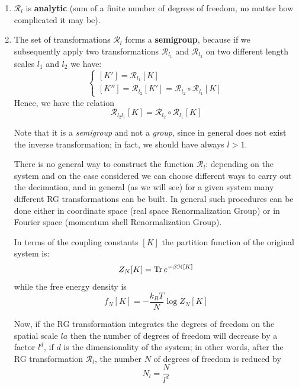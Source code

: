 \documentclass[../main/main.tex]{subfiles}
\begin{document}
\begin{enumerate}
\item \( \mathcal{R}_l \) is \textbf{analytic} (sum of a finite number of degrees of freedom, no matter how complicated it may be).


\item The set of  transformations \( \mathcal{R}_l \) forms a \textbf{semigroup}, because if we subsequently apply two transformations \(\mathcal{R}_{l_1}  \) and \(\mathcal{R}_{l_2}  \) on two different length scales \( l_1 \)  and \( l_2 \) we have:
\begin{equation*}
  \begin{cases}
   [K'] = \mathcal{R}_{l_1} [K] \\
  [K''] = \mathcal{R}_{l_2} [K'] = \mathcal{R}_{l_2} \circ \mathcal{R}_{l_1} [K]
  \end{cases}
\end{equation*}
Hence, we have the relation
\begin{equation}
  \mathcal{R}_{l_2 l_1} [K] = \mathcal{R}_{l_2} \circ \mathcal{R}_{l_1} [K]
\end{equation}

\begin{remark}
Note that it is a \emph{semigroup} and not a \emph{group}, since in general does not exist the inverse transformation; in fact, we should have always \( l>1 \).
\end{remark}

There is no general way to construct the function \(  \mathcal{R}_l  \): depending on the system and on the case considered we can choose different ways to carry out the decimation, and in general (as we will see) for a given system many different RG transformations can be built. In general such procedures can be done either in coordinate space (real space Renormalization Group) or in Fourier space (momentum shell Renormalization Group).

In terms of the coupling constants \( [K] \) the partition function of the original system is:
\begin{equation*}
  Z_N [K] = \Tr e^{-\beta \mathcal{H}[K]}
\end{equation*}
while the free energy density is
 \begin{equation*}
   f_N [K] = - \frac{k_B T}{N} \log{Z_N [K]}
 \end{equation*}

 Now, if the RG transformation integrates the degrees of freedom on the spatial scale \( la \)  then the number of degrees of freedom will decrease by a factor \( l^d \), if \( d \) is the dimensionality of the system; in other words, after the RG transformation \( \mathcal{R}_l \), the number \( N \) of degrees of freedom is reduced by
\begin{equation*}
  N_l = \frac{N}{l^d}
\end{equation*}


\end{enumerate}
\end{document}
